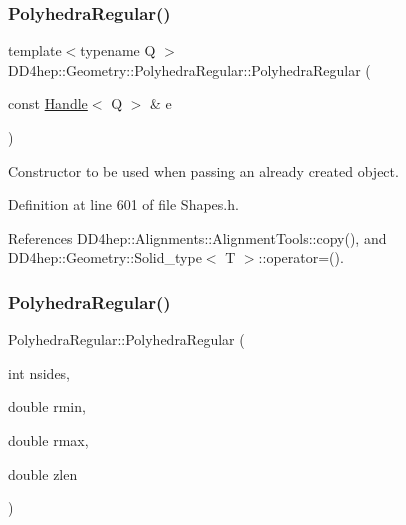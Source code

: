 \subsubsection{\texorpdfstring{Polyhedra\+Regular()}{PolyhedraRegular()}\hspace{0.1cm}{\footnotesize\ttfamily [4/7]}}
{\footnotesize\ttfamily template$<$typename Q $>$ \\
D\+D4hep\+::\+Geometry\+::\+Polyhedra\+Regular\+::\+Polyhedra\+Regular (\begin{DoxyParamCaption}\item[{const \hyperlink{class_d_d4hep_1_1_handle}{Handle}$<$ Q $>$ \&}]{e }\end{DoxyParamCaption})\hspace{0.3cm}{\ttfamily [inline]}}



Constructor to be used when passing an already created object. 



Definition at line 601 of file Shapes.\+h.



References D\+D4hep\+::\+Alignments\+::\+Alignment\+Tools\+::copy(), and D\+D4hep\+::\+Geometry\+::\+Solid\+\_\+type$<$ T $>$\+::operator=().

\hypertarget{class_d_d4hep_1_1_geometry_1_1_polyhedra_regular_a81603bb686b56fd58fd78942907c1fb6}{}\label{class_d_d4hep_1_1_geometry_1_1_polyhedra_regular_a81603bb686b56fd58fd78942907c1fb6} 
\subsubsection{\texorpdfstring{Polyhedra\+Regular()}{PolyhedraRegular()}\hspace{0.1cm}{\footnotesize\ttfamily [5/7]}}
{\footnotesize\ttfamily Polyhedra\+Regular\+::\+Polyhedra\+Regular (\begin{DoxyParamCaption}\item[{int}]{nsides,  }\item[{double}]{rmin,  }\item[{double}]{rmax,  }\item[{double}]{zlen }\end{DoxyParamCaption})}



